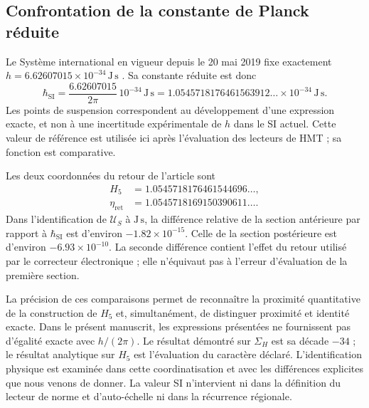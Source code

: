 \subsection{Confrontation de la constante de Planck réduite}
\label{sec:revision-planck-contraste}

Le Système international en vigueur depuis le 20 mai 2019 fixe
exactement \(h=6.62607015\times10^{-34}\,\mathrm{J\,s}\)
\cite{bipm2018}. Sa constante réduite est donc
\[
 \hbar_{\mathrm{SI}}=\frac{6.62607015}{2\pi}\,10^{-34}\,
 \mathrm{J\,s}
 =1.0545718176461563912\ldots\times10^{-34}\,\mathrm{J\,s}.
\]
Les points de suspension correspondent au développement d'une expression
exacte, et non à une incertitude expérimentale de \(h\) dans le SI actuel.
Cette valeur de référence est utilisée ici après l'évaluation des
lecteurs de HMT ; sa fonction est comparative.

Les deux coordonnées du retour de l'article sont
\begin{align*}
 H_5&=1.0545718176461544696\ldots,\\
 \eta_{\mathrm{ret}}&=1.0545718169150390611\ldots.
\end{align*}
Dans l'identification de \(\mathcal U_S\) à \(\mathrm{J\,s}\), la
différence relative de la section antérieure par rapport à
\(\hbar_{\mathrm{SI}}\) est d'environ \(-1.82\times10^{-15}\).
Celle de la section postérieure est d'environ \(-6.93\times10^{-10}\).
La seconde différence contient l'effet du retour utilisé par le
correcteur électronique ; elle n'équivaut pas à l'erreur d'évaluation de la
première section.

La précision de ces comparaisons permet de reconnaître la proximité
quantitative de la construction de \(H_5\) et, simultanément, de distinguer
proximité et identité exacte. Dans le présent manuscrit, les expressions
présentées ne fournissent pas d’égalité exacte avec \(h/(2\pi)\).
Le résultat démontré sur \(\Sigma_H\) est sa décade \(-34\) ;
le résultat analytique sur \(H_5\) est l’évaluation du caractère
déclaré. L’identification physique est examinée dans cette coordinatisation et avec les
différences explicites que nous venons de donner. La valeur SI n’intervient
ni dans la définition du lecteur de norme et d’auto-échelle ni dans la récurrence régionale.
